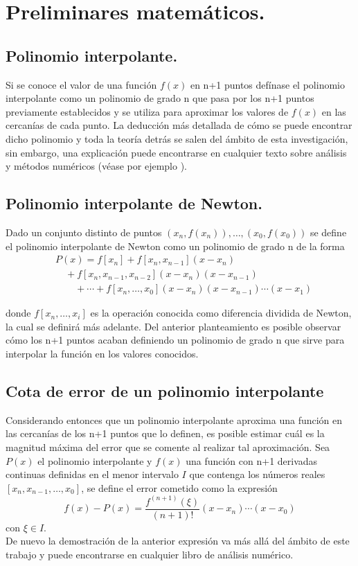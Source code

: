 \section{Preliminares matemáticos.}
\subsection{Polinomio interpolante.}
Si se conoce el valor de una función $f(x)$ en n+1 puntos defínase el polinomio
interpolante como un polinomio de grado n que pasa por los n+1 puntos
previamente establecidos y se utiliza para aproximar los valores de $f(x)$ en las cercanías de cada punto.
La deducción más detallada de cómo se puede encontrar dicho polinomio y toda la teoría detrás
se salen del ámbito de esta investigación, sin embargo, una explicación puede encontrarse en cualquier texto
sobre análisis y métodos numéricos (véase por ejemplo \cite{atkinson}).
\subsection{Polinomio interpolante de Newton.}
\begin{definition}
    \label{newton_poly}
    Dado un conjunto distinto de puntos $(x_n,f(x_n)),\ldots,(x_0,f(x_0))$ se define
    el polinomio interpolante de Newton como un polinomio de grado n de la forma
    \begin{equation}
        \begin{split}
            &P(x) =f[x_n]+f[x_n,x_{n-1}](x-x_n)\\
            &\quad +f[x_n,x_{n-1},x_{n-2}](x-x_n)(x-x_{n-1})\\
            &\qquad + \cdots + f[x_n,\ldots,x_0](x-x_n)(x-x_{n-1})\cdots(x-x_1) 
        \end{split} 
    \end{equation}  
\end{definition}
donde $f[x_n,\ldots,x_i]$ es la operación conocida como diferencia dividida de Newton,
la cual se definirá más adelante. Del anterior planteamiento es posible observar cómo
los n+1 puntos acaban definiendo un polinomio de grado n que sirve para interpolar
la función en los valores conocidos.
\subsection{Cota de error de un polinomio interpolante}
Considerando entonces que un polinomio interpolante aproxima una función 
en las cercanías de los n+1 puntos que lo definen, es posible estimar cuál es
la magnitud máxima del error que se comente al realizar tal aproximación. Sea $P(x)$ el
polinomio interpolante y $f(x)$ una función con n+1 derivadas continuas definidas en el menor intervalo $I$ que contenga los números reales $[x_n,x_{n-1},\ldots,x_0]$,
se define el error cometido como la expresión
\begin{equation}
    \label{lagrange_error}
    f(x)-P(x)=\frac{f^{\left(n+1\right)}(\xi)}{(n+1)!}(x-x_n)\cdots(x-x_0)
\end{equation}
con $\xi \in I$. \\De nuevo la demostración de la anterior expresión
va más allá del ámbito de este trabajo y puede encontrarse en cualquier
libro de análisis numérico.

